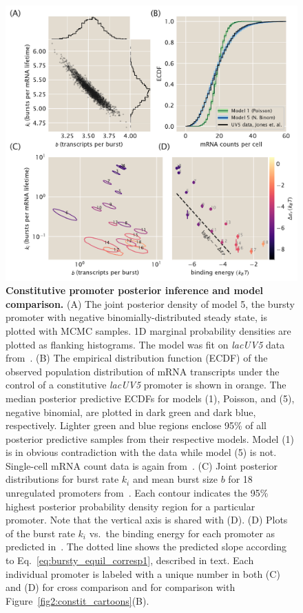 \begin{figure}%
\centering
\includegraphics[width=\textwidth]{../figures/main/fig03.pdf}
\caption{\textbf{Constitutive promoter posterior inference and model
comparison.} (A) The joint posterior density of model 5, the bursty promoter
with negative binomially-distributed steady state, is plotted with MCMC samples.
1D marginal probability densities are plotted as flanking histograms. The model
was fit on \textit{lacUV5} data from~\cite{Jones2014}. (B) The empirical
distribution function (ECDF) of the observed population distribution of mRNA
transcripts under the control of a constitutive \textit{lacUV5} promoter is
shown in orange. The median posterior predictive ECDFs for models (1), Poisson,
and (5), negative binomial, are plotted in dark green and dark blue,
respectively. Lighter green and blue regions enclose 95\% of all posterior
predictive samples from their respective models. Model (1) is in obvious
contradiction with the data while model (5) is not. Single-cell mRNA count data
is again from~\cite{Jones2014}. (C) Joint posterior distributions for burst rate
$k_i$ and mean burst size $b$ for 18 unregulated promoters
from~\cite{Jones2014}. Each contour indicates the 95\% highest posterior
probability density region for a particular promoter. Note that the vertical
axis is shared with (D). (D) Plots of the burst rate $k_i$ vs.\ the binding
energy for each promoter as predicted in~\cite{Brewster2012}. The dotted line
shows the predicted slope according to Eq.~\ref{eq:bursty_equil_corresp1},
described in text. Each individual promoter is labeled with a unique number in
both (C) and (D) for cross comparison and for comparison with 
Figure~\ref{fig2:constit_cartoons}(B).}
\label{fig:constit_post_full}
\end{figure}

